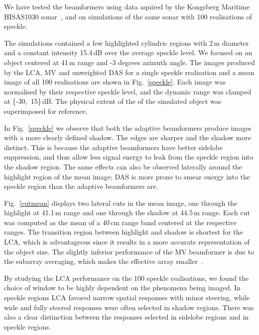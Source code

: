 \documentclass[10pt,journal,draftclsnofoot,onecolumn]{IEEEtran}
\newcommand\Fig[1]{Fig.~\ref{#1}}
\newcommand\1{\vec 1}
\begin{document}
We have tested the beamformers using data aquired by the Kongsberg Maritime HISAS1030 sonar~\cite{han09}, and on simulations of the same sonar with 100 realisations of speckle.

The simulations contained a few highlighted cylindric regions with 2\,m diameter and a constant intensity 15.4\,dB over the average speckle level. We focused on an object centered at 41\,m range and -3 degrees azimuth angle. The images produced by the LCA, MV and unweighted DAS for a single speckle realisation and a mean image of all 100 realisations are shown in \Fig{speckle}. Each image was normalised by their respective speckle level, and the dynamic range was clamped at \{-30,~15\}\,dB. The physical extent of the of the simulated object was superimposed for reference. %

In \Fig{speckle} we observe that both the adaptive beamformers produce images with a more clearly defined shadow. The edges are sharper and the shadow more distinct. This is because the adaptive beamformers have better sidelobe suppression, and thus allow less signal energy to leak from the speckle region into the shadow region. The same effects can also be observed laterally around the highlight region of the mean image; DAS is more prone to smear energy into the speckle region than the adaptive beamformers are.

\Fig{cutmean} displays two lateral cuts in the mean image, one through the highlight at 41.1\,m range and one through the shadow at 44.5\,m range. Each cut was computed as the mean of a 40\,cm range band centered at the respective ranges. The transition region between highlight and shadow is shortest for the LCA, which is advantageous since it results in a more accurate representation of the object size. The slightly inferior performance of the MV beamformer is due to the subarray averaging, which makes the effective array smaller~\cite{syn07}.

By studying the LCA performance on the 100 speckle realisations, we found the choice of window to be highly dependent on the phenomena being imaged. In speckle regions LCA favored narrow spatial responses with minor steering, while wide and fully steered responses were often selected in shadow regions. There was also a clear distinction between the responses selected in sidelobe regions and in speckle regions.

\end{document}

